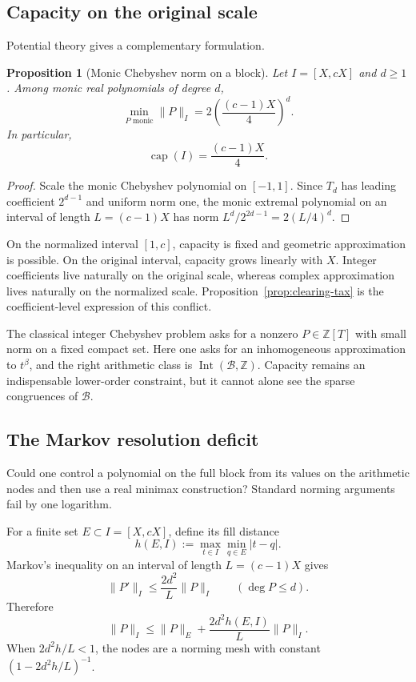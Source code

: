 \documentclass[11pt,oneside]{article}
\newtheorem{proposition}[theorem]{Proposition}
\theoremstyle{definition}
\theoremstyle{remark}
\newcommand{\Z}{\mathbb Z}
\newcommand{\Bsem}{\mathcal B}
\newcommand{\Int}{\operatorname{Int}}
\newcommand{\capc}{\operatorname{cap}}
\begin{document}
\subsection{Capacity on the original scale}

Potential theory gives a complementary formulation.

\begin{proposition}[Monic Chebyshev norm on a block]
\label{prop:monic-capacity}
Let $I=[X,cX]$ and $d\ge1$.  Among monic real polynomials of degree $d$,
\begin{equation}
 \min_{P\text{ monic}}\|P\|_I
 =2\left(\frac{(c-1)X}{4}\right)^d.
 \label{eq:monic-cheb}
\end{equation}
In particular,
\[
 \capc(I)=\frac{(c-1)X}{4}.
\]
\end{proposition}

\begin{proof}
Scale the monic Chebyshev polynomial on $[-1,1]$.  Since $T_d$ has leading coefficient
$2^{d-1}$ and uniform norm one, the monic extremal polynomial on an interval of length
$L=(c-1)X$ has norm $L^d/2^{2d-1}=2(L/4)^d$.
\end{proof}

On the normalized interval $[1,c]$, capacity is fixed and geometric approximation is
possible.  On the original interval, capacity grows linearly with $X$.  Integer coefficients
live naturally on the original scale, whereas complex approximation lives naturally on the
normalized scale.  Proposition~\ref{prop:clearing-tax} is the coefficient-level expression
of this conflict.

The classical integer Chebyshev problem asks for a nonzero $P\in\Z[T]$ with small norm on a
fixed compact set.  Here one asks for an inhomogeneous approximation to $t^\beta$, and the
right arithmetic class is $\Int(\Bsem,\Z)$.  Capacity remains an indispensable lower-order
constraint, but it cannot alone see the sparse congruences of $\Bsem$.

\subsection{The Markov resolution deficit}

Could one control a polynomial on the full block from its values on the arithmetic nodes and
then use a real minimax construction?  Standard norming arguments fail by one logarithm.

For a finite set $E\subset I=[X,cX]$, define its fill distance
\[
 h(E,I):=\max_{t\in I}\min_{q\in E}|t-q|.
\]
Markov's inequality on an interval of length $L=(c-1)X$ gives
\[
 \|P'\|_I\le\frac{2d^2}{L}\|P\|_I
 \qquad(\deg P\le d).
\]
Therefore
\begin{equation}
 \|P\|_I
 \le \|P\|_E+\frac{2d^2h(E,I)}{L}\|P\|_I.
 \label{eq:markov-norming}
\end{equation}
When $2d^2h/L<1$, the nodes are a norming mesh with constant
$(1-2d^2h/L)^{-1}$.
\end{document}

